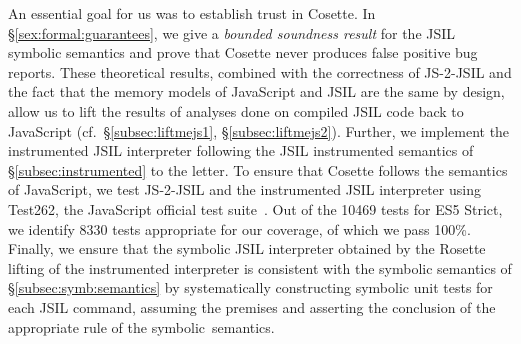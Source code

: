 \documentclass[sigconf, review]{acmart}
\newcommand{\jsil}{JSIL\xspace}
\newcommand{\JSComp}{JS-2-JSIL\xspace}
\newcommand{\polish}[1]{{\color{red}#1}}
\newcommand{\cosette}{Cosette\xspace}
\newcommand{\pgmaxinline}[1]{ {\color{purple} *** PG : #1 ***} }
\begin{document}










An essential goal for us was to establish trust in Cosette. In \S\ref{sex:formal:guarantees}, we give a {\em bounded soundness result} for the \jsil symbolic semantics and prove that \cosette never produces false positive bug reports. These theoretical results, combined with the correctness of \JSComp and the fact that the memory models of JavaScript and \jsil are the same by design, 
allow us to lift the results of analyses done on compiled
\jsil code back to JavaScript (cf.~\S\ref{subsec:liftmejs1}, \S\ref{subsec:liftmejs2}).
Further, we implement the instrumented JSIL interpreter following the \jsil 
instrumented semantics of \S\ref{subsec:instrumented} to the letter.
To ensure that Cosette follows the semantics of JavaScript, we test
JS-2-JSIL and the instrumented JSIL interpreter using Test262, 
the JavaScript official test suite~\cite{test262}. Out of the
10469 tests for ES5 Strict, we identify 8330 tests appropriate
for our coverage, of which we pass 100\%.
Finally, we ensure that the symbolic \jsil interpreter obtained by the 
Rosette lifting of the instrumented interpreter is consistent 
with the symbolic semantics of \S\ref{subsec:symb:semantics}
by systematically constructing symbolic unit tests for each \jsil command,
assuming the premises and asserting the conclusion of the 
appropriate rule of the symbolic~semantics. 





\end{document}
